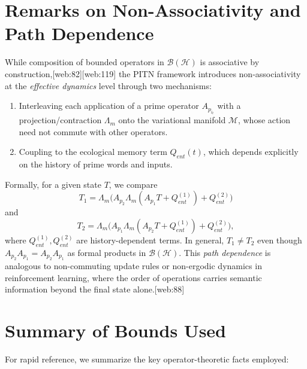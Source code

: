 \documentclass[11pt]{article}
\begin{document}
\section{Remarks on Non-Associativity and Path Dependence}

While composition of bounded operators in \( \mathcal{B}(\mathcal{H}) \) is associative by construction,[web:82][web:119] the PITN framework introduces non-associativity at the \emph{effective dynamics} level through two mechanisms:

\begin{enumerate}[leftmargin=*]
  \item Interleaving each application of a prime operator \( A_{p_{i_t}} \) with a projection/contraction \( \Lambda_m \) onto the variational manifold \( \mathcal{M} \), whose action need not commute with other operators.
  \item Coupling to the ecological memory term \( Q_{ent}(t) \), which depends explicitly on the history of prime words and inputs.
\end{enumerate}

Formally, for a given state \( T \), we compare
\[
T_1 = \Lambda_m\big(A_{p_2}\Lambda_m(A_{p_1} T + Q_{ent}^{(1)}) + Q_{ent}^{(2)}\big)
\]
and
\[
T_2 = \Lambda_m\big(A_{p_1}\Lambda_m(A_{p_2} T + Q_{ent}^{(1)}) + Q_{ent}^{(2)}\big),
\]
where \( Q_{ent}^{(1)}, Q_{ent}^{(2)} \) are history-dependent terms. In general, \( T_1 \neq T_2 \) even though \( A_{p_2}A_{p_1} = A_{p_2}A_{p_1} \) as formal products in \( \mathcal{B}(\mathcal{H}) \). This \emph{path dependence} is analogous to non-commuting update rules or non-ergodic dynamics in reinforcement learning, where the order of operations carries semantic information beyond the final state alone.[web:88]

\section{Summary of Bounds Used}

For rapid reference, we summarize the key operator-theoretic facts employed:
\end{document}
